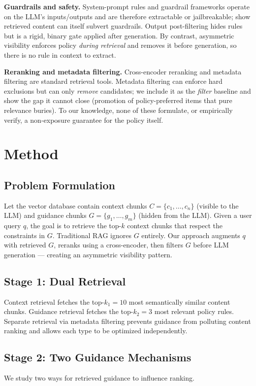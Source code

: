 \documentclass[11pt]{article}
\begin{document}
\textbf{Guardrails and safety.} System-prompt rules and guardrail frameworks operate on the
LLM's inputs/outputs and are therefore extractable or jailbreakable; \citet{robey2024rag} show
retrieved content can itself subvert guardrails. Output post-filtering hides rules but is a
rigid, binary gate applied after generation. By contrast, asymmetric visibility enforces policy
\emph{during retrieval} and removes it before generation, so there is no rule in context to
extract.

\textbf{Reranking and metadata filtering.} Cross-encoder reranking \citep{nogueira2019passage,
pradeep2021expando} and metadata filtering are standard retrieval tools. Metadata filtering can
enforce hard exclusions but can only \emph{remove} candidates; we include it as the
\emph{filter} baseline and show the gap it cannot close (promotion of policy-preferred items
that pure relevance buries). To our knowledge, none of these formulate, or empirically verify,
a non-exposure guarantee for the policy itself.

\section{Method}

\subsection{Problem Formulation}
Let the vector database contain context chunks $C=\{c_1,\dots,c_n\}$ (visible to the LLM) and
guidance chunks $G=\{g_1,\dots,g_m\}$ (hidden from the LLM). Given a user query $q$, the goal
is to retrieve the top-$k$ context chunks that respect the constraints in $G$. Traditional
RAG ignores $G$ entirely. Our approach augments $q$ with retrieved $G$, reranks using a
cross-encoder, then filters $G$ before LLM generation --- creating an asymmetric visibility
pattern.

\subsection{Stage 1: Dual Retrieval}
Context retrieval fetches the top-$k_1{=}10$ most semantically similar content chunks.
Guidance retrieval fetches the top-$k_2{=}3$ most relevant policy rules. Separate retrieval
via metadata filtering prevents guidance from polluting content ranking and allows each type
to be optimized independently.

\subsection{Stage 2: Two Guidance Mechanisms}
We study two ways for retrieved guidance to influence ranking.
\end{document}
